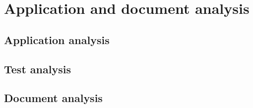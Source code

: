 \documentclass[../ATD.tex]{subfiles}
\begin{document}
    \chapter{Application and document analysis}\label{ch:application-and-document-analysis}
    \section{Application analysis}\label{sec:application-analysis}


    \section{Test analysis}\label{sec:test-analysis}


    \section{Document analysis}\label{sec:document-analysis}

\end{document}
